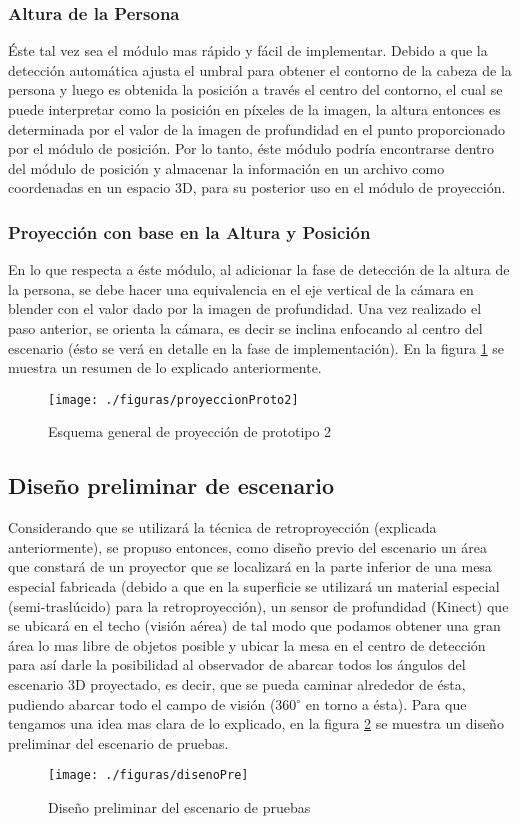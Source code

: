 \documentclass[a4paper,openright,12pt]{report}
\begin{document}
\subsubsection{Altura de la Persona}
Éste tal vez sea el módulo mas rápido y fácil de implementar. Debido a que la detección automática ajusta el umbral para obtener el contorno de la cabeza de la persona y luego es obtenida la posición a través el centro del contorno, el cual se puede interpretar como la posición en píxeles de la imagen, la altura entonces es determinada por el valor de la imagen de profundidad en el punto proporcionado por el módulo de posición. Por lo tanto, éste módulo podría encontrarse dentro del módulo de posición y almacenar la información en un archivo como coordenadas en un espacio 3D, para su posterior uso en el módulo de proyección.
\subsubsection{Proyección con base en la Altura y Posición}
En lo que respecta a éste módulo, al adicionar la fase de detección de la altura de la persona, se debe hacer una equivalencia en el eje vertical de la cámara en blender con el valor dado por la imagen de profundidad. Una vez realizado el paso anterior, se orienta la cámara, es decir se inclina enfocando al centro del escenario (ésto se verá en detalle en la fase de implementación). En la figura \ref{fig:proyeccionProto2} se muestra un resumen de lo explicado anteriormente.
\begin{figure}[th]
	\centering
	\texttt{[image: ./figuras/proyeccionProto2]}
	\caption{Esquema general de proyección de prototipo 2} \label{fig:proyeccionProto2}
\end{figure}
\subsection{Diseño preliminar de escenario}
Considerando que se utilizará la técnica de retroproyección (explicada anteriormente), se propuso entonces, como diseño previo del escenario un área que constará de un proyector que se localizará en la parte inferior de una mesa especial fabricada (debido a que en la superficie se utilizará un material especial (semi-traslúcido) para la retroproyección), un sensor de profundidad (Kinect\textcopyright) que se ubicará en el techo (visión aérea) de tal modo que podamos obtener una gran área lo mas libre de objetos posible y ubicar la mesa en el centro de detección para así darle la posibilidad al observador de abarcar todos los ángulos del escenario 3D proyectado, es decir, que se pueda caminar alrededor de ésta, pudiendo abarcar todo el campo de visión (360$^{\circ}$ en torno a ésta). Para que tengamos una idea mas clara de lo explicado, en la figura \ref{fig:disenoPre}  se muestra un diseño preliminar del escenario de pruebas.
\begin{figure}[th]
	\centering
	\texttt{[image: ./figuras/disenoPre]}
	\caption{Diseño preliminar del escenario de pruebas} \label{fig:disenoPre}
\end{figure}
\end{document}
